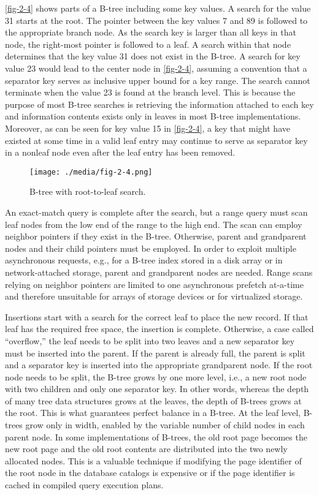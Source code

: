 \autoref{fig-2-4} shows parts of a B-tree including some key values. A search
for the value 31 starts at the root. The pointer between the key values
7 and 89 is followed to the appropriate branch node. As the search key
is larger than all keys in that node, the right-most pointer is followed
to a leaf. A search within that node determines that the key value 31
does not exist in the B-tree. A search for key value 23 would lead to
the center node in \autoref{fig-2-4}, assuming a convention that a separator
key serves as inclusive upper bound for a key range. The search cannot
terminate when the value 23 is found at the branch level. This is
because the purpose of most B-tree searches is retrieving the
information attached to each key and information contents exists only in
leaves in most B-tree implementations. Moreover, as can be seen for key
value 15 in \autoref{fig-2-4}, a key that might have existed at some time in a
valid leaf entry may continue to serve as separator key in a nonleaf
node even after the leaf entry has been removed.

\begin{figure}
  \centering
  \texttt{[image: ./media/fig-2-4.png]}

  \caption{B-tree with root-to-leaf search.\label{fig-2-4}}
\end{figure}

An exact-match query is complete after the search, but a range query
must scan leaf nodes from the low end of the range to the high end. The
scan can employ neighbor pointers if they exist in the B-tree.
Otherwise, parent and grandparent nodes and their child pointers must be
employed. In order to exploit multiple asynchronous requests, e.g., for
a B-tree index stored in a disk array or in network-attached storage,
parent and grandparent nodes are needed. Range scans relying on neighbor
pointers are limited to one asynchronous prefetch at-a-time and
therefore unsuitable for arrays of storage devices or for virtualized
storage.

Insertions start with a search for the correct leaf to place the new
record. If that leaf has the required free space, the insertion is
complete. Otherwise, a case called ``overflow,'' the leaf needs to be
split into two leaves and a new separator key must be inserted into the
parent. If the parent is already full, the parent is split and a
separator key is inserted into the appropriate grandparent node. If the
root node needs to be split, the B-tree grows by one more level, i.e., a
new root node with two children and only one separator key. In other
words, whereas the depth of many tree data structures grows at the
leaves, the depth of B-trees grows at the root. This is what guarantees
perfect balance in a B-tree. At the leaf level, B-trees grow only in
width, enabled by the variable number of child nodes in each parent
node. In some implementations of B-trees, the old root page becomes the
new root page and the old root contents are distributed into the two
newly allocated nodes. This is a valuable technique if modifying the
page identifier of the root node in the database catalogs is expensive
or if the page identifier is cached in compiled query execution plans.

